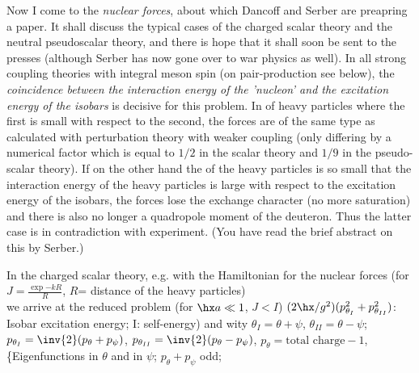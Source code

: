 Now I come to the \textit{nuclear forces}, about which Dancoff and Serber are preapring a paper. It shall discuss the typical cases of the charged scalar theory and the neutral pseudoscalar theory, and there is hope that it shall soon be sent to the presses (although Serber has now gone over to war physics as well). In all strong coupling theories with integral meson spin (on pair-production see below), the \textit{coincidence between the interaction energy of the 'nucleon' and the excitation energy of the isobars} is decisive for this problem. In  of heavy particles where the first is small with respect to the second, the forces are of the same type as calculated with perturbation theory with weaker coupling (only differing by a numerical factor which is equal to $1/2$ in the scalar theory and $1/9$ in the pseudo-scalar theory). If on the other hand the  of the heavy particles is so small that the interaction energy of the heavy particles is large with respect to the excitation energy of the isobars, the forces lose the exchange character (no more saturation) and there is also no longer a quadropole moment of the deuteron. Thus the latter case is in contradiction with experiment. (You have read the brief abstract on this by Serber.)

In the charged scalar theory, e.g. with the Hamiltonian
for the nuclear forces
(for  $J=\frac{\exp{-kR}}{R}$, $R$= distance of the heavy particles)\\
we arrive at the reduced problem (for $\hx a \ll 1$, $J<I$)
$(2\hx/g^2)(p_{\theta_I}^2 + p_{\theta_{II}}^2)$: Isobar excitation energy; I: self-energy) and wity $\theta_I = \theta + \psi$, $\theta_{II} = \theta - \psi$; $p_{\theta_I} = \inv{2}(p_\theta + p_\psi)$, $p_{\theta_{II}} = \inv{2}(p_\theta - p_\psi)$, $p_\theta = \text{total charge} - 1$,
\{Eigenfunctions  in $\theta$ and in $\psi$; $p_\theta + p_\psi$ odd;

